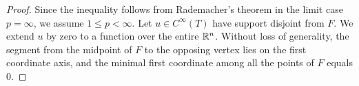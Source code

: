 \documentclass[10pt,a4paper]{article}
\begin{document}
\begin{proof}

    Since the inequality follows from Rademacher's theorem in the limit case $p = \infty$,
    we assume $1 \leq p < \infty$. 
    Let $u \in C^{\infty}(T)$ have support disjoint from $F$.
    We extend $u$ by zero to a function over the entire ${\mathbb R}^{n}$.
    Without loss of generality, 
    the segment from the midpoint of $F$ to the opposing vertex lies on the first coordinate axis,
    and the minimal first coordinate among all the points of $F$ equals $0$. 

\end{proof}
\end{document}
